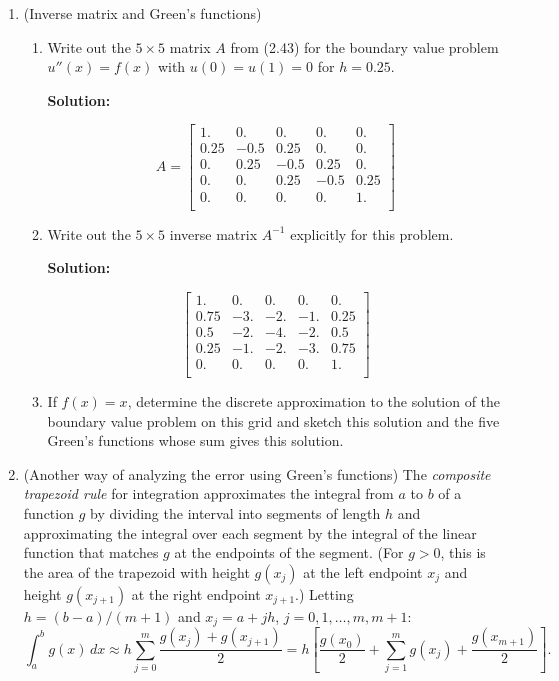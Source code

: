 \documentclass[letterpaper,12pt]{article}
\begin{document}
\begin{enumerate}
\item (Inverse matrix and Green's functions)
\begin{enumerate}
\item Write out the $5\times 5$
matrix $A$ from (2.43) for the boundary value problem
$u''(x)=f(x)$ with $u(0)=u(1)=0$ for  $h = 0.25$.


{\bf Solution:}


\[A = \begin{bmatrix}
        1. & 0. & 0. & 0. & 0.\\
        0.25 & -0.5 & 0.25 & 0. & 0.\\ 
        0. & 0.25 & -0.5 & 0.25 & 0.\\ 
        0. & 0. & 0.25 & -0.5 & 0.25\\ 
        0. & 0. & 0. & 0. & 1.\\
        \end{bmatrix} \]


\item Write out the $5\times 5$
inverse matrix $A^{-1}$ explicitly for this problem.

{\bf Solution:}

\[\begin{bmatrix}
 1. & 0. & 0. & 0. & 0.\\  
 0.75 & -3. & -2. & -1. & 0.25\\
 0.5 & -2. & -4. & -2. & 0.5\\
 0.25 & -1. & -2. & -3. & 0.75\\
 0. & 0. & 0. & 0. & 1.\\
 \end{bmatrix}\]

\item
If $f(x)=x$, determine the discrete approximation to the solution of the
boundary value problem on this grid and sketch this solution and the five
Green's functions whose sum gives this solution.
\end{enumerate}

\item (Another way of analyzing the error using Green's functions)
The {\em composite trapezoid rule} for integration approximates the
integral from $a$ to $b$ of a function $g$ by dividing the interval
into segments of length $h$ and approximating the integral over each
segment by the integral of the linear function that matches $g$ at
the endpoints of the segment. (For $g > 0$, this is the area of
the trapezoid with height $g( x_j )$ at the left endpoint $x_j$
and height $g( x_{j+1} )$ at the right endpoint $x_{j+1}$.)  Letting
$h = (b-a)/(m+1)$ and $x_j = a + jh$, $j = 0,1, \ldots , m, m+1$:
\[
\int_a^b g(x)\,dx \approx  h \sum_{j=0}^m \frac{g( x_j )+g( x_{j+1} )}{2} 
     =  h \left[ \frac{g( x_0 )}{2} + \sum_{j=1}^m g( x_j ) + 
                   \frac{g( x_{m+1} )}{2} \right] .
\]


\end{enumerate}
\end{document}
